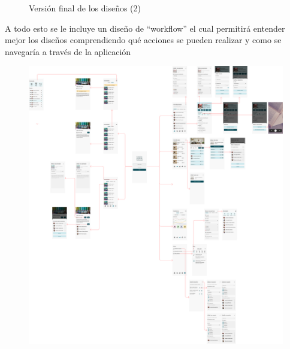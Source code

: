 \begin{figure}[hp!]
    \caption{Versión final de los diseños (2)}
    \label{fig:dis-fin2}

\end{figure}

\newpage

A todo esto se le incluye un diseño de ``workflow'' el cual permitirá entender mejor los diseños comprendiendo qué acciones se pueden realizar y como se navegaría a través de la aplicación

\begin{figure}[h!]
    \centering
    \includegraphics[width=\linewidth]{diseno/app/presentacion/workflow.png}
\end{figure}
